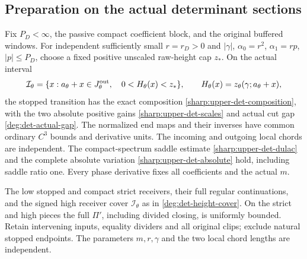 \subsection{Preparation on the actual determinant sections}

\begin{lemma}
\label{deg:lem-determinant-preparation}
Fix \(P_D<\infty\), the passive compact coefficient block, and the
original buffered windows. For independent sufficiently small
\(r=r_D>0\) and \(|\gamma|\), \(\alpha_0=r^2\),
\(\alpha_1=rp\), \(|p|\le P_D\), choose a fixed positive unscaled
raw-height cap \(z_*\). On the actual interval
\begin{equation}\label{deg:det-actual-receiver}
 \mathcal I_\theta=\{x:a_\theta+x\in J_\theta^{\rm out},\quad
       0<H_\theta(x)<z_*\},\qquad
 H_\theta(x)=z_\theta(\gamma;a_\theta+x),
\end{equation}
the stopped transition has the exact composition
\eqref{sharp:upper-det-composition}, with the two absolute positive
gains \eqref{sharp:upper-det-scales} and actual cut gap
\eqref{deg:det-actual-gap}. The normalized end maps and their inverses
have common ordinary \(C^3\) bounds and derivative units. The incoming
and outgoing local chords are independent. The compact-spectrum saddle
estimate \eqref{sharp:upper-det-dulac} and the complete absolute
variation \eqref{sharp:upper-det-absolute} hold, including saddle ratio
one. Every phase derivative fixes all coefficients and the actual \(m\).

The low stopped and compact strict receivers, their full regular
continuations, and the signed high receiver cover \(\mathcal I_\theta\)
as in \eqref{deg:det-height-cover}. On the strict and high pieces the
full \(\Pi'\), including divided closing, is uniformly bounded.
Retain intervening inputs, equality dividers and all original clips;
exclude natural stopped endpoints. The parameters \(m,r,\gamma\)
and the two local chord lengths are independent.
\end{lemma}

